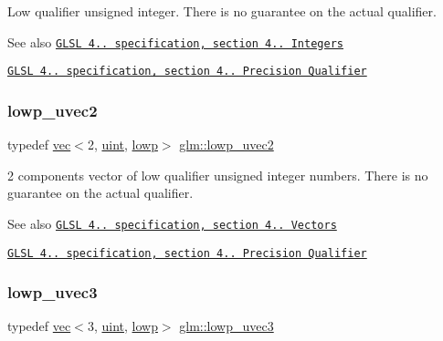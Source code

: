 Low qualifier unsigned integer. There is no guarantee on the actual qualifier.

\begin{DoxySeeAlso}{See also}
\href{http://www.opengl.org/registry/doc/GLSLangSpec.4.20.8.pdf}{\tt G\+L\+SL 4.. specification, section 4.. Integers} 

\href{http://www.opengl.org/registry/doc/GLSLangSpec.4.20.8.pdf}{\tt G\+L\+SL 4.. specification, section 4.. Precision Qualifier} 
\end{DoxySeeAlso}
\mbox{\label{group__core__precision_gaf2f2771efb431071890586c01401ebd8}} 
\subsubsection{\texorpdfstring{lowp\+\_\+uvec2}{lowp\_uvec2}}
{\footnotesize\ttfamily typedef \mbox{\hyperlink{structglm_1_1vec}{vec}}$<$2, \mbox{\hyperlink{group__core__precision_ga4fd29415871152bfb5abd588334147c8}{uint}}, \mbox{\hyperlink{namespaceglm_a36ed105b07c7746804d7fdc7cc90ff25ae161af3fc695e696ce3bf69f7332bc2d}{lowp}}$>$ \mbox{\hyperlink{group__core__precision_gaf2f2771efb431071890586c01401ebd8}{glm\+::lowp\+\_\+uvec2}}}

2 components vector of low qualifier unsigned integer numbers. There is no guarantee on the actual qualifier.

\begin{DoxySeeAlso}{See also}
\href{http://www.opengl.org/registry/doc/GLSLangSpec.4.20.8.pdf}{\tt G\+L\+SL 4.. specification, section 4.. Vectors} 

\href{http://www.opengl.org/registry/doc/GLSLangSpec.4.20.8.pdf}{\tt G\+L\+SL 4.. specification, section 4.. Precision Qualifier} 
\end{DoxySeeAlso}
\mbox{\label{group__core__precision_gab06a83e99d38e15a3e54d38208b9deba}} 
\subsubsection{\texorpdfstring{lowp\+\_\+uvec3}{lowp\_uvec3}}
{\footnotesize\ttfamily typedef \mbox{\hyperlink{structglm_1_1vec}{vec}}$<$3, \mbox{\hyperlink{group__core__precision_ga4fd29415871152bfb5abd588334147c8}{uint}}, \mbox{\hyperlink{namespaceglm_a36ed105b07c7746804d7fdc7cc90ff25ae161af3fc695e696ce3bf69f7332bc2d}{lowp}}$>$ \mbox{\hyperlink{group__core__precision_gab06a83e99d38e15a3e54d38208b9deba}{glm\+::lowp\+\_\+uvec3}}}

